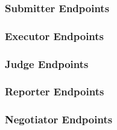 \documentclass[11pt,letterpaper]{article}
\begin{document}
\subsubsection{Submitter Endpoints}
\label{comm-endpoints-sub}

\subsubsection{Executor Endpoints}
\label{comm-endpoints-exec}

\subsubsection{Judge Endpoints}
\label{comm-endpoints-judge}

\subsubsection{Reporter Endpoints}
\label{comm-endpoints-report}

\subsubsection{Negotiator Endpoints}
\label{comm-endpoints-hub}
\end{document}
